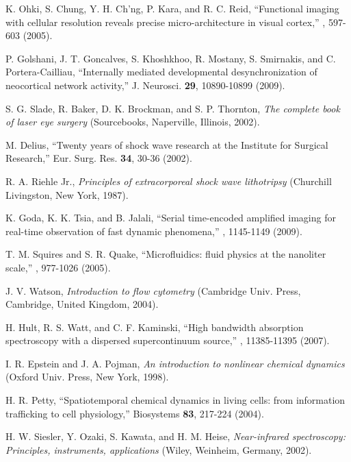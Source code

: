 \documentclass[10pt,letterpaper]{article}
\begin{document}
\begin{thebibliography}{99}

 K. Ohki, S. Chung, Y. H. Ch'ng, P. Kara, and R. C. Reid, ``Functional imaging with cellular resolution reveals precise micro-architecture in visual cortex,'' , 597-603 (2005).

 P. Golshani, J. T. Goncalves, S. Khoshkhoo, R. Mostany, S. Smirnakis, and C. Portera-Cailliau, ``Internally mediated developmental desynchronization of neocortical network activity,'' J. Neurosci. {\bf 29}, 10890-10899 (2009).

 S. G. Slade, R. Baker, D. K. Brockman, and S. P. Thornton, {\it The complete book of laser eye surgery} (Sourcebooks, Naperville, Illinois, 2002).

 M. Delius, ``Twenty years of shock wave research at the Institute for Surgical Research,'' Eur. Surg. Res. {\bf 34}, 30-36 (2002).

 R. A. Riehle Jr., {\it Principles of extracorporeal shock wave lithotripsy} (Churchill Livingston, New York, 1987).

 K. Goda, K. K. Tsia, and B. Jalali, ``Serial time-encoded amplified imaging for real-time observation of fast dynamic phenomena,'' , 1145-1149 (2009).

 T. M. Squires and S. R. Quake, ``Microfluidics: fluid physics at the nanoliter scale,'' , 977-1026 (2005).

 J. V. Watson, {\it Introduction to flow cytometry} (Cambridge Univ. Press, Cambridge, United Kingdom, 2004).

 H. Hult, R. S. Watt, and C. F. Kaminski, ``High bandwidth absorption spectroscopy with a dispersed supercontinuum source,'' , 11385-11395 (2007).

 I. R. Epstein and J. A. Pojman, {\it An introduction to nonlinear chemical dynamics} (Oxford Univ. Press, New York, 1998).

 H. R. Petty, ``Spatiotemporal chemical dynamics in living cells: from information trafficking to cell physiology,'' Biosystems {\bf 83}, 217-224 (2004).

 H. W. Siesler, Y. Ozaki, S. Kawata, and H. M. Heise, {\it Near-infrared spectroscopy: Principles, instruments, applications} (Wiley, Weinheim, Germany, 2002).


\end{thebibliography}
\end{document}
